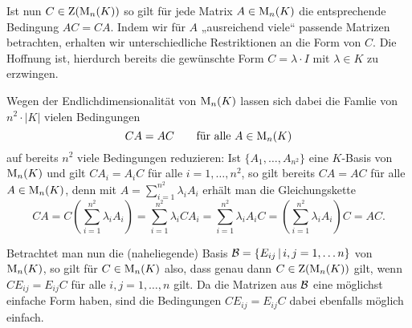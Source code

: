 \begin{remark}
  Ist nun $C \in \operatorname{Z}( \operatorname{M}_{n}(K) )$ so gilt für jede Matrix $A \in \operatorname{M}_{n}(K)$ die entsprechende Bedingung $A C = C A$.
  Indem wir für $A$ „ausreichend viele“ passende Matrizen betrachten, erhalten wir unterschiedliche Restriktionen an die Form von $C$.
  Die Hoffnung ist, hierdurch bereits die gewünschte Form $C = \lambda \cdot I$ mit $\lambda \in K$ zu erzwingen.
  
  Wegen der Endlichdimensionalität von $\operatorname{M}_{n}(K)$ lassen sich dabei die Famlie von $n^2 \cdot |K|$ vielen Bedingungen
  \[
    CA = AC
    \qquad
    \text{für alle $A \in \operatorname{M}_{n}(K)$}
  \]
  auf bereits $n^2$ viele Bedingungen reduzieren:
  Ist $\{ A_1, \dotsc, A_{n^2} \}$ eine $K$-Basis von $\operatorname{M}_{n}(K)$ und gilt $C A_i = A_i C$ für alle $i = 1, \dotsc, n^2$, so gilt bereits $C A = A C$ für alle $A \in \operatorname{M}_{n}(K)$, denn mit $A = \sum_{i=1}^{n^2} \lambda_i A_i$ erhält man die Gleichungskette
  \[
      C A
    = C \left( \sum_{i=1}^{n^2} \lambda_i A_i \right)
    = \sum_{i=1}^{n^2} \lambda_i C A_i
    = \sum_{i=1}^{n^2} \lambda_i A_i C
    = \left( \sum_{i=1}^{n^2} \lambda_i A_i \right) C
    = A C.
  \]
  
  Betrachtet man nun die (naheliegende) Basis $\mathcal{B} = \{ E_{ij} \,|\, i, j = 1, \dotsc n \}$ von $\operatorname{M}_{n}(K)$, so gilt für $C \in \operatorname{M}_{n}(K)$ also, dass genau dann $C \in \operatorname{Z}( \operatorname{M}_{n}(K) )$ gilt, wenn $C E_{ij} = E_{ij} C$ für alle $i, j = 1, \dotsc, n$ gilt.
  Da die Matrizen aus $\mathcal{B}$ eine möglichst einfache Form haben, sind die Bedingungen $C E_{ij} = E_{ij} C$ dabei ebenfalls möglich einfach.
\end{remark}

